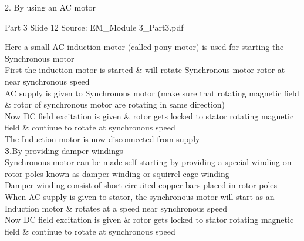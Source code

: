 \documentclass[11pt,a4paper]{article}
\begin{document}
\begin{mdframed}[roundcorner=9pt,backgroundcolor=white,linecolor=anthGreen,linewidth=1pt,innerleftmargin=12pt,innerrightmargin=12pt,innertopmargin=10pt,innerbottommargin=10pt,skipabove=8pt,skipbelow=10pt]
{\HeadingFont\fontsize{15}{18}\selectfont\color{anthDark}2. By using an AC motor\par}
{\color{anthMid}\small Part 3 \textbullet{} Slide 12 \textbullet{} Source: EM\_Module 3\_Part3.pdf\par}
\vspace{0.5em}
{\small
\textcolor{anthGreen}{\textbullet}\hspace{0.65em}Here a small AC induction motor (called pony motor) is used for starting the Synchronous motor\\
\textcolor{anthGreen}{\textbullet}\hspace{0.65em}First the induction motor is started \& will rotate Synchronous motor rotor at near synchronous speed\\
\textcolor{anthGreen}{\textbullet}\hspace{0.65em}AC supply is given to Synchronous motor (make sure that rotating magnetic field \& rotor of synchronous motor are rotating in same direction)\\
\textcolor{anthGreen}{\textbullet}\hspace{0.65em}Now DC field excitation is given \& rotor gets locked to stator rotating magnetic field \& continue to rotate at synchronous speed\\
\textcolor{anthGreen}{\textbullet}\hspace{0.65em}The Induction motor is now disconnected from supply\\
\textcolor{anthGreen}{\textbf{3.}}\hspace{0.5em}By providing damper windings\\
\textcolor{anthGreen}{\textbullet}\hspace{0.65em}Synchronous motor can be made self starting by providing a special winding on rotor poles known as damper winding or squirrel cage winding\\
\textcolor{anthGreen}{\textbullet}\hspace{0.65em}Damper winding consist of short circuited copper bars placed in rotor poles\\
\textcolor{anthGreen}{\textbullet}\hspace{0.65em}When AC supply is given to stator, the synchronous motor will start as an Induction motor \& rotates at a speed near synchronous speed\\
\textcolor{anthGreen}{\textbullet}\hspace{0.65em}Now DC field excitation is given \& rotor gets locked to stator rotating magnetic field \& continue to rotate at synchronous speed\\

}
\end{mdframed}
\end{document}
